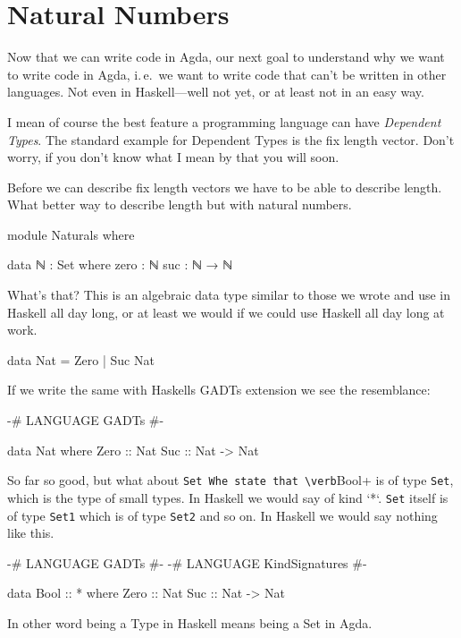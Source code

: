 \section{Natural Numbers}
Now that we can write code in Agda, our next goal to understand why we
want to write code in Agda, i. e. we want to write code that can’t be
written in other languages. Not even in Haskell—well not yet, or at
least not in an easy way.

I mean of course the best feature a programming language can have
\emph{Dependent Types}. The standard example for Dependent Types is the
fix length vector. Don’t worry, if you don’t know what I mean by that
you will soon.

Before we can describe fix length vectors we have to be able to describe
length. What better way to describe length but with natural numbers.

\begin{code}
module Naturals where

data ℕ : Set where
  zero : ℕ
  suc  : ℕ → ℕ
\end{code}

What's that? This is an algebraic data type similar to those we wrote and use
in Haskell all day long, or at least we would if we could use Haskell all day
long at work.

\begin{haskell}
data Nat = Zero | Suc Nat
\end{haskell}

If we write the same with Haskells GADTs extension we see the resemblance:

\begin{haskell}
{-# LANGUAGE GADTs #-}

data Nat where
  Zero  :: Nat
  Suc   :: Nat -> Nat
\end{haskell}

So far so good, but what about \verb+Set Whe state that \verb+Bool+ is of type
\verb+Set+, which is the type of small types. In Haskell we would say of kind `*`.
\verb+Set+ itself is of type \verb+Set1+ which is of type \verb+Set2+ and so on. In Haskell
we would say nothing like this.

\begin{haskell}
{-# LANGUAGE GADTs          #-}
{-# LANGUAGE KindSignatures #-}

data Bool :: * where
  Zero  :: Nat
  Suc   :: Nat -> Nat
\end{haskell}

In other word being a Type in Haskell means being a Set in Agda.

